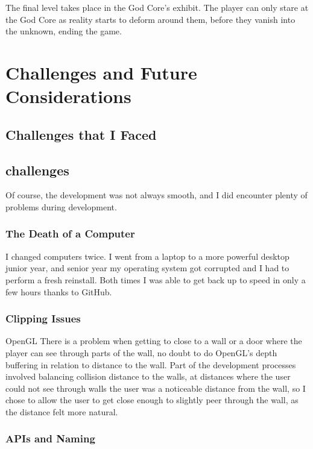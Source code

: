 \documentclass{article}
\begin{document}
The final level takes place in the God Core's exhibit. The player can only stare at the God Core as reality starts to deform around them, before they vanish into the unknown, ending the game.

\section{Challenges and Future Considerations} \label{sec:problemsandfuture}

\subsection{Challenges that I Faced} \subsection{challenges}

Of course, the development was not always smooth, and I did encounter plenty of problems during development.

\subsubsection{The Death of a Computer} \label{subsubsec:death}

I changed computers twice. I went from a laptop to a more powerful desktop junior year, and senior year my operating system got corrupted and I had to perform a fresh reinstall. Both times I was able to get back up to speed in only a few hours thanks to GitHub.

\subsubsection{Clipping Issues} \label{subsubsec:clipping}

OpenGL There is a problem when getting to close to a wall or a door where the player can see through parts of the wall, no doubt to do OpenGL's depth buffering in relation to distance to the wall. Part of the development processes involved balancing collision distance to the walls, at distances where the user could not see through walls the user was a noticeable distance from the wall, so I chose to allow the user to get close enough to slightly peer through the wall, as the distance felt more natural.

\subsubsection{APIs and Naming} \label{subsubsec:naming}
\end{document}
